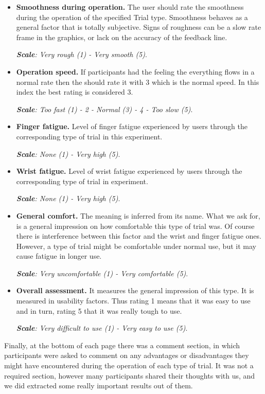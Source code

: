 \begin{itemize}
\item \textbf{Smoothness during operation.} The user should rate the smoothness during the operation of the specified Trial type. Smoothness behaves as a general factor that is totally subjective. Signs of roughness can be a slow rate frame in the graphics, or lack on the accuracy of the feedback line. 

\emph{\textbf{Scale}: Very rough (1) - Very smooth (5)}.


\item \textbf{Operation speed.} If participants had the feeling the everything flows in a normal rate then the should rate it with 3 which is the normal speed. In this index the best rating is considered 3.

\emph{\textbf{Scale}: Too fast (1) - 2 - Normal (3) - 4 - Too slow (5)}.

\item \textbf{Finger fatigue.} Level of finger fatigue experienced by users through the corresponding type of trial in this experiment.

\emph{\textbf{Scale}: None (1) - Very high (5)}.

\item \textbf{Wrist fatigue.} Level of wrist fatigue experienced by users through the corresponding type of trial in experiment.

\emph{\textbf{Scale}: None (1) - Very high (5)}.

\item \textbf{General comfort.} The meaning is inferred from its name. What we ask for, is a general impression on how comfortable this type of trial was. Of course there is interference between this factor and the wrist and finger fatigue ones. However, a type of trial might be comfortable under normal use, but it may cause fatigue in longer use.

\emph{\textbf{Scale}: Very uncomfortable (1) - Very comfortable (5)}.

\item \textbf{Overall assessment.} It measures the general impression of this type. It is measured in usability factors. Thus rating 1 means that it was easy to use and in turn, rating 5 that it was really tough to use.

\emph{\textbf{Scale}: Very difficult to use (1) - Very easy to use (5)}.
\end{itemize}

Finally, at the bottom of each page there was a comment section, in which participants were asked to comment on any advantages or disadvantages they might have encountered during the operation of each type of trial. It was not a required section, however many participants shared their thoughts with us, and we did extracted some really important results out of them.









